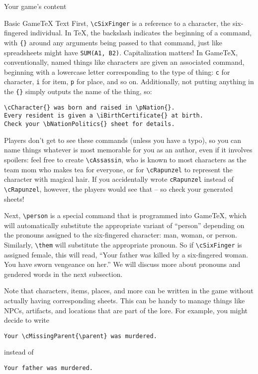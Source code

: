 \documentclass{article}
\newcommand{\gametex}{GameTeX}
\begin{document}
\begin{section}{Your game's content}
\begin{subsection}{Basic \gametex{} Text}
First, \lstinline{\cSixFinger} is a reference to a character, the six-fingered individual.  In \TeX{}, the backslash indicates the beginning of a command, with \lstinline|{}| around any arguments being passed to that command, just like spreadsheets might have \texttt{SUM(A1, B2)}.  Capitalization matters!  In \gametex{}, conventionally, named things like characters are given an associated command, beginning with a lowercase letter corresponding to the type of thing: \lstinline{c} for character, \lstinline{i} for item, \lstinline{p} for place, and so on.  Additionally, not putting anything in the \lstinline|{}| simply outputs the name of the thing, so: 
\begin{verbatim}
\cCharacter{} was born and raised in \pNation{}.
Every resident is given a \iBirthCertificate{} at birth.
Check your \bNationPolitics{} sheet for details.
\end{verbatim}

Players don't get to see these commands (unless you have a typo), so you can name things whatever is most memorable for you as an author, even if it involves spoilers: feel free to create \lstinline|\cAssassin|, who is known to most characters as the team mom who makes tea for everyone, or for \lstinline{\cRapunzel} to represent the character with magical hair.  If you accidentally wrote \lstinline{cRapunzel} instead of \lstinline{\cRapunzel}, however, the players would see that -- so check your generated sheets!

Next, \lstinline{\person} is a special command that is programmed into \gametex{}, which will automatically substitute the appropriate variant of ``person'' depending on the pronouns assigned to the six-fingered character: man, woman, or person.  Similarly, \lstinline{\them} will substitute the appropriate pronoun.  So if \lstinline{\cSixFinger} is assigned female, this will read, ``Your father was killed by a six-fingered woman.  You have sworn vengeance on her.''  We will discuss more about pronouns and gendered words in the next subsection.

Note that characters, items, places, and more can be written in the game without actually having corresponding sheets.  This can be handy to manage things like NPCs, artifacts, and locations that are part of the lore.  For example, you might decide to write 
\begin{verbatim}
Your \cMissingParent{\parent} was murdered.
\end{verbatim}
instead of 
\begin{verbatim}
Your father was murdered.
\end{verbatim}


\end{subsection}
\end{section}
\end{document}
